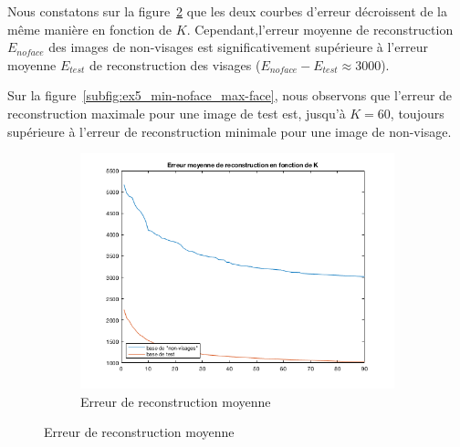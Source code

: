 \documentclass[a4paper]{article}
\newcommand{\figref}[1]{figure~\ref{#1}}
\begin{document}
Nous constatons sur la \figref{subfig:ex5_err_mean} que les deux courbes
d'erreur décroissent de la même manière en fonction de $K$. Cependant,l'erreur
moyenne de reconstruction $E_{noface}$ des images de non-visages est
significativement supérieure à l'erreur moyenne $E_{test}$ de reconstruction des
visages ($E_{noface} - E_{test} \approx 3000$). 

Sur la \figref{subfig:ex5_min-noface_max-face}, nous observons que l'erreur de
reconstruction maximale pour une image de test est, jusqu'à $K=60$, toujours
supérieure à l'erreur de reconstruction minimale pour une image de non-visage.\\

\begin{figure}[H]
    \centering
     
    \begin{subfigure}[c]{0.6\textwidth}
        \centering
        \includegraphics[width=\textwidth]{images/ex5_err_mean_noface_test.png}
        \caption{Erreur de reconstruction moyenne}
        \label{subfig:ex5_err_mean}
    \end{subfigure}


\end{figure}
\end{document}
